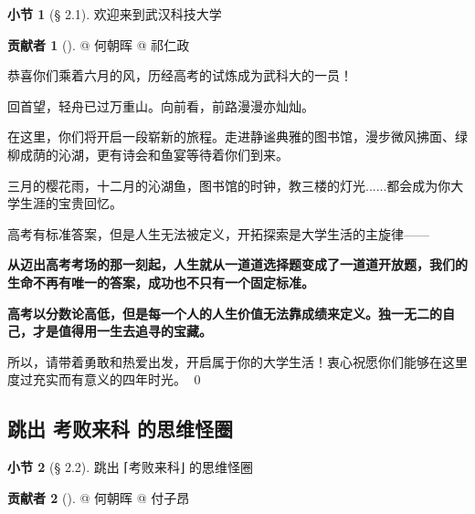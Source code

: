 \documentclass{beamer}	%
\theoremstyle{plain}
\theoremstyle{definition}
\newtheorem{ex}{贡献者}[section]
\newtheorem{dfn}{小节}[section]
\theoremstyle{remark}
\numberwithin{equation}{section}
\begin{document}
\begin{frame}
	\begin{dfn}[§ 2.1]
		欢迎来到武汉科技大学
	\end{dfn}

	\begin{ex}[]
		@ 何朝晖 @ 祁仁政
	\end{ex}
\end{frame}

\begin{frame}
	恭喜你们乘着六月的风，历经高考的试炼成为武科大的一员！
	\vspace{0.5cm}
	
	回首望，轻舟已过万重山。向前看，前路漫漫亦灿灿。
	\vspace{0.5cm}

	在这里，你们将开启一段崭新的旅程。走进静谧典雅的图书馆，漫步微风拂面、绿柳成荫的沁湖，更有诗会和鱼宴等待着你们到来。
	\vspace{0.5cm}

	三月的樱花雨，十二月的沁湖鱼，图书馆的时钟，教三楼的灯光......都会成为你大学生涯的宝贵回忆。

\end{frame}

\begin{frame}
	高考有标准答案，但是人生无法被定义，开拓探索是大学生活的主旋律——
	\vspace{0.5cm}
	
	\textbf{从迈出高考考场的那一刻起，人生就从一道道选择题变成了一道道开放题，我们的生命不再有唯一的答案，成功也不只有一个固定标准。}
	\vspace{0.5cm}
	
	\textbf{高考以分数论高低，但是每一个人的人生价值无法靠成绩来定义。独一无二的自己，才是值得用一生去追寻的宝藏。}
	\vspace{0.5cm}
	
	所以，请带着勇敢和热爱出发，开启属于你的大学生活！衷心祝愿你们能够在这里度过充实而有意义的四年时光。
	\qed
\end{frame}

\subsection{跳出 考败来科 的思维怪圈}

\begin{frame}
	\begin{dfn}[§ 2.2]
		跳出 ⌈考败来科⌋ 的思维怪圈
	\end{dfn}

	\begin{ex}[]
		@ 何朝晖 @ 付子昂
	\end{ex}

\end{frame}
\end{document}
